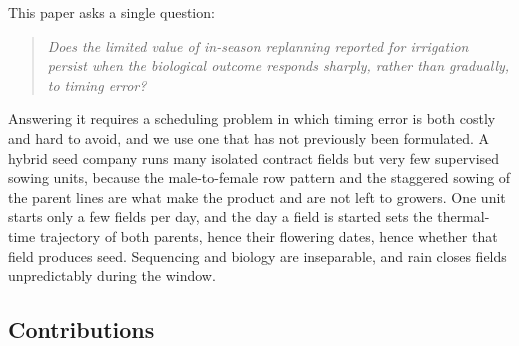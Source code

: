 \documentclass[10pt,twocolumn]{article}
\begin{document}
This paper asks a single question:

\begin{quote}
\itshape Does the limited value of in-season replanning reported for
irrigation persist when the biological outcome responds sharply, rather than
gradually, to timing error?
\end{quote}

Answering it requires a scheduling problem in which timing error is both
costly and hard to avoid, and we use one that has not previously been
formulated. A hybrid seed company runs many isolated contract fields but very
few supervised sowing units, because the male-to-female row pattern and the
staggered sowing of the parent lines are what make the product and are not
left to growers. One unit starts only a few fields per day, and the day a
field is started sets the thermal-time trajectory of both parents, hence
their flowering dates, hence whether that field produces seed. Sequencing and
biology are inseparable, and rain closes fields unpredictably during the
window.

\subsection{Contributions}
\end{document}
